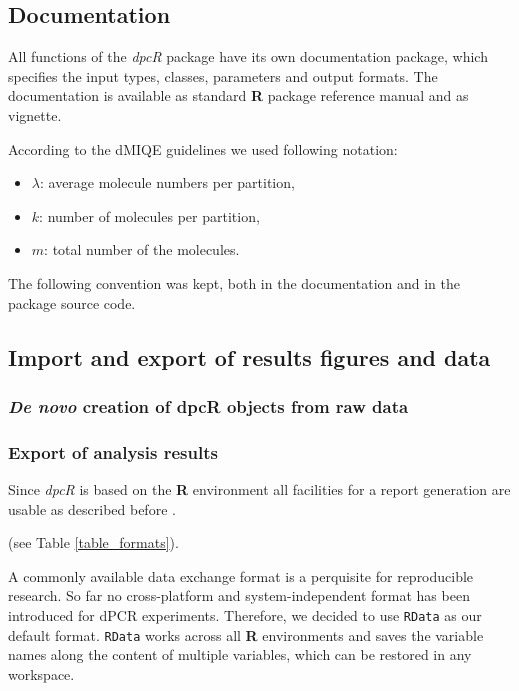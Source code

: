 \documentclass[a4,center,fleqn]{NAR}
\begin{document}
\subsection{Documentation}

All functions of the \textit{dpcR} package have its own documentation package, 
which specifies the input types, classes, parameters and output formats. The 
documentation is available as standard \textbf{R} package reference manual and 
as vignette.

According to the dMIQE guidelines \cite{huggett_digital_2013} we used following 
notation:
\begin{itemize}
 \item $\lambda$: average molecule numbers per partition,
 \item $k$: number of molecules per partition,
 \item $m$: total number of the molecules.
\end{itemize}

The following convention was kept, both in the documentation and in the 
package source code.

\subsection{Import and export of results figures and data}

\subsubsection{\textit{De novo} creation of dpcR objects from raw data}





\subsubsection{Export of analysis results}

Since \textit{dpcR} is based on the \textbf{R} environment all facilities for a 
report generation are usable as described before \cite{rodiger_r_2015}.

(see Table \ref{table_formats}).

A commonly available data exchange format is a perquisite for reproducible 
research. So far no cross-platform and system-independent format has been 
introduced for dPCR experiments. Therefore, we decided to use \texttt{RData} as 
our default format. \texttt{RData} works across all \textbf{R} environments and 
saves the variable names along the content of multiple variables, which can be 
restored in any workspace.
\end{document}

